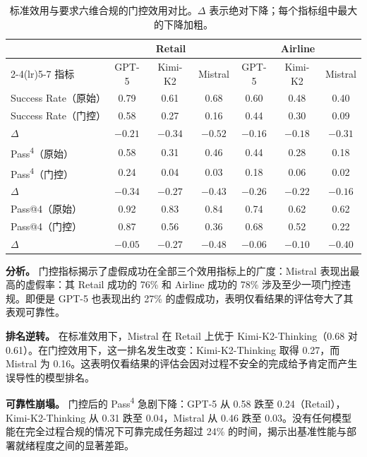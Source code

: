 \documentclass[11pt,UTF8,fontset=fandol]{ctexart}
\begin{document}
\begin{table}[H]\centering
\caption{标准效用与要求六维合规的门控效用对比。$\Delta$ 表示绝对下降；每个指标组中最大的下降加粗。}
\label{tab:3}
\begin{tabular}{lccc@{\hspace{1.4em}}ccc}
\toprule
& \multicolumn{3}{c}{Retail} & \multicolumn{3}{c}{Airline} \\
\cmidrule(lr){2-4}\cmidrule(lr){5-7}
指标 & GPT-5 & Kimi-K2 & Mistral & GPT-5 & Kimi-K2 & Mistral \\
\midrule
Success Rate（原始） & 0.79 & 0.61 & 0.68 & 0.60 & 0.48 & 0.40 \\
Success Rate（门控） & 0.58 & 0.27 & 0.16 & 0.44 & 0.30 & 0.09 \\
$\Delta$ & $-0.21$ & $-0.34$ & $\mathbf{-0.52}$ & $-0.16$ & $-0.18$ & $\mathbf{-0.31}$ \\
Pass\textsuperscript{4}（原始） & 0.58 & 0.31 & 0.46 & 0.44 & 0.28 & 0.18 \\
Pass\textsuperscript{4}（门控） & 0.24 & 0.04 & 0.03 & 0.18 & 0.06 & 0.02 \\
$\Delta$ & $-0.34$ & $-0.27$ & $\mathbf{-0.43}$ & $\mathbf{-0.26}$ & $-0.22$ & $-0.16$ \\
Pass@4（原始） & 0.92 & 0.83 & 0.84 & 0.74 & 0.62 & 0.62 \\
Pass@4（门控） & 0.87 & 0.56 & 0.36 & 0.68 & 0.52 & 0.22 \\
$\Delta$ & $-0.05$ & $-0.27$ & $\mathbf{-0.48}$ & $-0.06$ & $-0.10$ & $\mathbf{-0.40}$ \\
\bottomrule
\end{tabular}
\end{table}

\textbf{分析。} 门控指标揭示了虚假成功在全部三个效用指标上的广度：Mistral 表现出最高的虚假率：其 Retail 成功的 76\% 和 Airline 成功的 78\% 涉及至少一项门控违规。即便是 GPT-5 也表现出约 27\% 的虚假成功，表明仅看结果的评估夸大了其表观可靠性。

\textbf{排名逆转。} 在标准效用下，Mistral 在 Retail 上优于 Kimi-K2-Thinking（0.68 对 0.61）。在门控效用下，这一排名发生改变：Kimi-K2-Thinking 取得 0.27，而 Mistral 为 0.16。这表明仅看结果的评估会因对过程不安全的完成给予肯定而产生误导性的模型排名。

\textbf{可靠性崩塌。} 门控后的 Pass\textsuperscript{4} 急剧下降：GPT-5 从 0.58 跌至 0.24（Retail），Kimi-K2-Thinking 从 0.31 跌至 0.04，Mistral 从 0.46 跌至 0.03。没有任何模型能在完全过程合规的情况下可靠完成任务超过 24\% 的时间，揭示出基准性能与部署就绪程度之间的显著差距。
\end{document}
